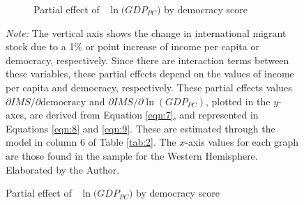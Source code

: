 \documentclass[../main.tex]{subfiles}
\begin{document}
\begin{figure}[H]
{\begin{minipage}{\textwidth}
\begin{subfigure}[b]{0.49\textwidth}
    \caption{Partial effect of \ $\ln{(GDP_{PC}})$ by democracy score}
    \label{fig:7b}
    \end{subfigure}
    \textit{Note:} The vertical axis shows the change in international migrant stock due to a 1\% or point increase of income per capita or democracy, respectively. Since there are interaction terms between these variables, these partial effects depend on the values of income per capita and democracy, respectively. These partial effects values $\partial IMS/\partial \text{democracy}$ and $\partial IMS/\partial \ln(GDP_{PC})$, plotted in the $y$-axes, are derived from Equation \ref{eqn:7}, and represented in Equations \ref{eqn:8} and \ref{eqn:9}. These are estimated through the model in column 6 of Table \ref{tab:2}. The $x$-axis values for each graph are those found in the sample for the Western Hemisphere. Elaborated by the Author. 
    \end{minipage}
    }
\end{figure}
\end{document}
